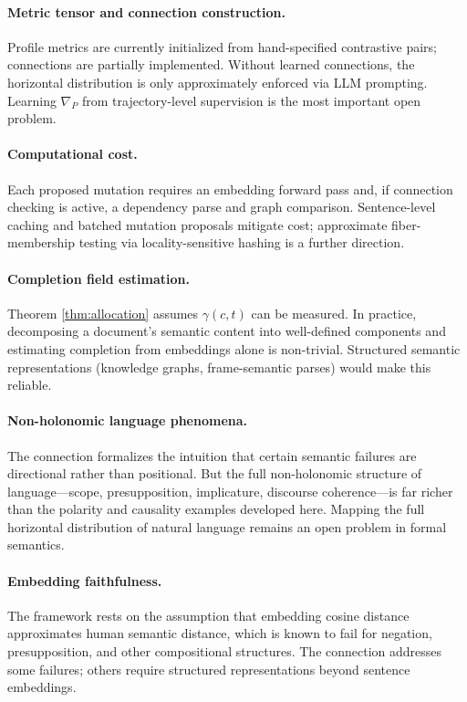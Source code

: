 \documentclass[12pt, a4paper]{article}
\theoremstyle{plain}
\theoremstyle{definition}
\theoremstyle{remark}
\newcommand{\connD}{\nabla}
\begin{document}
\paragraph{Metric tensor and connection construction.}
Profile metrics are currently initialized from hand-specified contrastive pairs;
connections are partially implemented.  Without learned connections, the
horizontal distribution is only approximately enforced via LLM prompting.
Learning $\connD_P$ from trajectory-level supervision is the most important
open problem.

\paragraph{Computational cost.}
Each proposed mutation requires an embedding forward pass and, if connection
checking is active, a dependency parse and graph comparison.  Sentence-level
caching and batched mutation proposals mitigate cost; approximate fiber-membership
testing via locality-sensitive hashing is a further direction.

\paragraph{Completion field estimation.}
Theorem \ref{thm:allocation} assumes $\gamma(c,t)$ can be measured.  In
practice, decomposing a document's semantic content into well-defined components
and estimating completion from embeddings alone is non-trivial.  Structured
semantic representations (knowledge graphs, frame-semantic parses) would make
this reliable.

\paragraph{Non-holonomic language phenomena.}
The connection formalizes the intuition that certain semantic failures are
directional rather than positional.  But the full non-holonomic structure of
language---scope, presupposition, implicature, discourse coherence---is far
richer than the polarity and causality examples developed here.  Mapping the
full horizontal distribution of natural language remains an open problem in
formal semantics.

\paragraph{Embedding faithfulness.}
The framework rests on the assumption that embedding cosine distance approximates
human semantic distance, which is known to fail for negation, presupposition,
and other compositional structures.  The connection addresses some failures;
others require structured representations beyond sentence embeddings.
\end{document}
